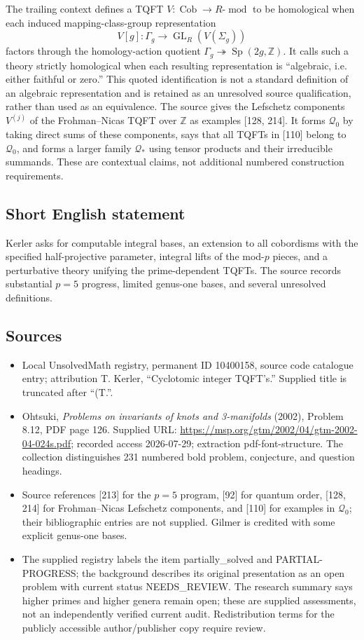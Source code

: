 \documentclass[11pt]{article}
\newcommand{\Z}{\mathbb{Z}}
\begin{document}
The trailing context defines a TQFT \(V:\operatorname{Cob}\to R\text{-}\operatorname{mod}\) to be homological when each induced mapping-class-group representation
\[
 V[g]:\Gamma_g\longrightarrow\operatorname{GL}_R(V(\Sigma_g))
\]
factors through the homology-action quotient \(\Gamma_g\twoheadrightarrow\operatorname{Sp}(2g,\Z)\). It calls such a theory strictly homological when each resulting representation is ``algebraic, i.e. either faithful or zero.'' This quoted identification is not a standard definition of an algebraic representation and is retained as an unresolved source qualification, rather than used as an equivalence. The source gives the Lefschetz components \(V^{(j)}\) of the Frohman--Nicas TQFT over \(\Z\) as examples [128, 214]. It forms \(\mathcal Q_0\) by taking direct sums of these components, says that all TQFTs in [110] belong to \(\mathcal Q_0\), and forms a larger family \(\mathcal Q_*\) using tensor products and their irreducible summands. These are contextual claims, not additional numbered construction requirements.
\subsection{Short English statement}
Kerler asks for computable integral bases, an extension to all cobordisms with the specified half-projective parameter, integral lifts of the mod-\(p\) pieces, and a perturbative theory unifying the prime-dependent TQFTs. The source records substantial \(p=5\) progress, limited genus-one bases, and several unresolved definitions.
\subsection{Sources}
\begin{itemize}
\item Local UnsolvedMath registry, permanent ID 10400158, source code catalogue entry; attribution T. Kerler, ``Cyclotomic integer TQFT's.'' Supplied title is truncated after ``(T.''.
\item Ohtsuki, \emph{Problems on invariants of knots and 3-manifolds} (2002), Problem 8.12, PDF page 126. Supplied URL: \url{https://msp.org/gtm/2002/04/gtm-2002-04-024s.pdf}; recorded access 2026-07-29; extraction pdf-font-structure. The collection distinguishes 231 numbered bold problem, conjecture, and question headings.
\item Source references [213] for the \(p=5\) program, [92] for quantum order, [128, 214] for Frohman--Nicas Lefschetz components, and [110] for examples in \(\mathcal Q_0\); their bibliographic entries are not supplied. Gilmer is credited with some explicit genus-one bases.
\item The supplied registry labels the item partially\_solved and PARTIAL-PROGRESS; the background describes its original presentation as an open problem with current status NEEDS\_REVIEW. The research summary says higher primes and higher genera remain open; these are supplied assessments, not an independently verified current audit. Redistribution terms for the publicly accessible author/publisher copy require review.
\end{itemize}
\end{document}
